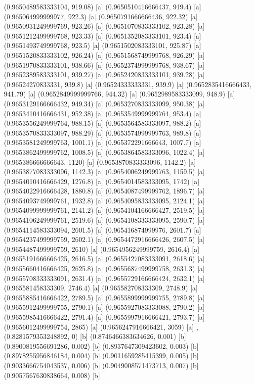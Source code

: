 {{{(0.9650489583333104, 919.08) [a] 
(0.9650510416666437, 919.4) [a] 
(0.965064999999977, 922.3) [a] 
(0.9650791666666436, 922.32) [a] 
(0.9650931249999769, 923.26) [a] 
(0.9651070833333102, 923.28) [a] 
(0.9651212499999768, 923.33) [a] 
(0.9651352083333101, 923.4) [a] 
(0.9651493749999768, 923.5) [a] 
(0.9651502083333101, 925.87) [a] 
(0.9651520833333102, 926.24) [a] 
(0.9651568749999768, 926.29) [a] 
(0.9651970833333101, 938.66) [a] 
(0.9652374999999768, 938.67) [a] 
(0.9652389583333101, 939.27) [a] 
(0.9652420833333101, 939.28) [a] 
(0.96524270833331, 939.8) [a] 
(0.96524333333331, 939.9) [a] 
(0.9652835416666433, 941.79) [a] 
(0.9652849999999766, 944.32) [a] 
(0.9652989583333099, 948.9) [a] 
(0.9653129166666432, 949.34) [a] 
(0.9653270833333099, 950.38) [a] 
(0.9653410416666431, 952.38) [a] 
(0.9653549999999764, 953.4) [a] 
(0.9653556249999764, 988.15) [a] 
(0.9653564583333097, 988.2) [a] 
(0.9653570833333097, 988.29) [a] 
(0.9653574999999763, 989.8) [a] 
(0.9653581249999763, 1001.1) [a] 
(0.965372291666643, 1007.7) [a] 
(0.9653862499999762, 1008.5) [a] 
(0.9653864583333096, 1022.4) [a] 
(0.965386666666643, 1120) [a] 
(0.9653870833333096, 1142.2) [a] 
(0.9653877083333096, 1142.3) [a] 
(0.9654006249999763, 1159.5) [a] 
(0.9654010416666429, 1276.8) [a] 
(0.9654014583333095, 1742) [a] 
(0.9654022916666428, 1880.8) [a] 
(0.9654087499999762, 1896.7) [a] 
(0.9654093749999761, 1932.8) [a] 
(0.9654095833333095, 2124.1) [a] 
(0.9654099999999761, 2141.2) [a] 
(0.9654104166666427, 2519.5) [a] 
(0.9654106249999761, 2519.6) [a] 
(0.9654108333333095, 2590.7) [a] 
(0.9654114583333094, 2601.5) [a] 
(0.965416874999976, 2601.7) [a] 
(0.9654237499999759, 2602.1) [a] 
(0.9654472916666426, 2607.5) [a] 
(0.9654487499999759, 2610) [a] 
(0.9654956249999759, 2616.4) [a] 
(0.9655191666666425, 2616.5) [a] 
(0.9655427083333091, 2618.6) [a] 
(0.9655660416666425, 2625.8) [a] 
(0.9655687499999758, 2631.3) [a] 
(0.9655708333333091, 2631.4) [a] 
(0.9655729166666424, 2632.1) [a] 
(0.965581458333309, 2746.4) [a] 
(0.965582708333309, 2748.9) [a] 
(0.9655885416666422, 2789.5) [a] 
(0.9655899999999755, 2789.8) [a] 
(0.9655912499999755, 2790.1) [a] 
(0.9655927083333088, 2790.2) [a] 
(0.9655985416666422, 2791.4) [a] 
(0.9655997916666421, 2793.7) [a] 
(0.9656012499999754, 2865) [a] 
(0.9656247916666421, 3059) [a] 
},{(0.8281579353248892, 0) [b] 
(0.8746466383634626, 0.001) [b] 
(0.8900819556691286, 0.002) [b] 
(0.8937647309423602, 0.003) [b] 
(0.8978255956846184, 0.004) [b] 
(0.9011659285415399, 0.005) [b] 
(0.9033666754043537, 0.006) [b] 
(0.9049008571473713, 0.007) [b] 
(0.9057567630838664, 0.008) [b] 
}}}
